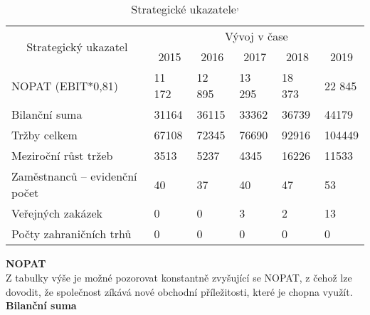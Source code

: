 \begin{table}[!hbtp]
\centering
\begin{tabular}{|l|lllll|}
\hline
\multicolumn{1}{|c|}{\multirow{2}{*}{Strategický ukazatel}} & \multicolumn{5}{c|}{Vývoj v čase} \\ \cline{2-6} 
\multicolumn{1}{|c|}{} & \multicolumn{1}{c|}{2015} & \multicolumn{1}{c|}{2016} & \multicolumn{1}{c|}{2017} & \multicolumn{1}{c|}{2018} & \multicolumn{1}{c|}{2019} \\ \hline
NOPAT (EBIT*0,81) & \multicolumn{1}{l|}{11 172} & \multicolumn{1}{l|}{12 895} & \multicolumn{1}{l|}{13 295} & \multicolumn{1}{l|}{18 373} & 22 845 \\ \hline
Bilanční suma & \multicolumn{1}{l|}{31164} & \multicolumn{1}{l|}{36115} & \multicolumn{1}{l|}{33362} & \multicolumn{1}{l|}{36739} & 44179 \\ \hline
Tržby celkem & \multicolumn{1}{l|}{67108} & \multicolumn{1}{l|}{72345} & \multicolumn{1}{l|}{76690} & \multicolumn{1}{l|}{92916} & 104449 \\ \hline
Meziroční růst tržeb & \multicolumn{1}{l|}{3513} & \multicolumn{1}{l|}{5237} & \multicolumn{1}{l|}{4345} & \multicolumn{1}{l|}{16226} & 11533 \\ \hline
Zaměstnanců – evidenční počet & \multicolumn{1}{l|}{40} & \multicolumn{1}{l|}{37} & \multicolumn{1}{l|}{40} & \multicolumn{1}{l|}{47} & 53 \\ \hline
Veřejných zakázek & \multicolumn{1}{l|}{0} & \multicolumn{1}{l|}{0} & \multicolumn{1}{l|}{3} & \multicolumn{1}{l|}{2} & 13 \\ \hline
Počty zahraničních trhů & \multicolumn{1}{l|}{0} & \multicolumn{1}{l|}{0} & \multicolumn{1}{l|}{0} & \multicolumn{1}{l|}{0} & 0 \\ \hline
\end{tabular}
\caption[Strategické ukazatele]{Strategické ukazatele\textsuperscript{,}}
\label{tab:Strategicke ukazatele}
\end{table}

\noindent\textbf{NOPAT}\\

Z tabulky výše je možné pozorovat konstantně zvyšující se NOPAT, z čehož lze dovodit, že společnost zíkává nové obchodní příležitosti, které je chopna využít.\\

\noindent\textbf{Bilanční suma}\\

